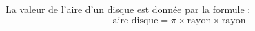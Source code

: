 La valeur de l'aire d'un disque est donnée par la formule :
$$\text{aire disque}=\pi\times\text{rayon}\times\text{rayon}$$